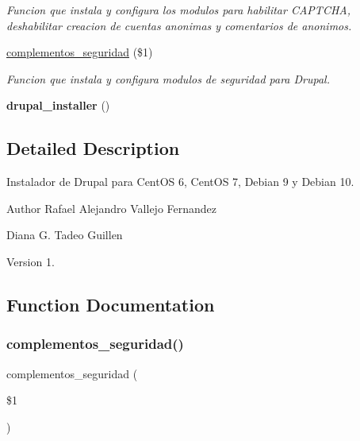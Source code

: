 \begin{DoxyCompactItemize}
\begin{DoxyCompactList}\small\item\em Funcion que instala y configura los modulos para habilitar C\+A\+P\+T\+C\+HA, deshabilitar creacion de cuentas anonimas y comentarios de anonimos. \end{DoxyCompactList}\item 
\hyperlink{Drupal__Instalador__General_8sh_a13df4a377004ee8af67f8e2495fe1afd}{complementos\+\_\+seguridad} (\$1)
\begin{DoxyCompactList}\small\item\em Funcion que instala y configura modulos de seguridad para Drupal. \end{DoxyCompactList}\item 
\mbox{\label{Drupal__Instalador__General_8sh_a829178a8034b48b89aa02399b2cef0f2}} 
{\bfseries drupal\+\_\+installer} ()
\end{DoxyCompactItemize}


\subsection{Detailed Description}
Instalador de Drupal para Cent\+OS 6, Cent\+OS 7, Debian 9 y Debian 10. 

\begin{DoxyAuthor}{Author}
Rafael Alejandro Vallejo Fernandez 

Diana G. Tadeo Guillen 
\end{DoxyAuthor}
\begin{DoxyVersion}{Version}
1. 
\end{DoxyVersion}


\subsection{Function Documentation}
\mbox{\label{Drupal__Instalador__General_8sh_a13df4a377004ee8af67f8e2495fe1afd}} 
\subsubsection{\texorpdfstring{complementos\+\_\+seguridad()}{complementos\_seguridad()}}
{\footnotesize\ttfamily complementos\+\_\+seguridad (\begin{DoxyParamCaption}\item[{}]{\$1 }\end{DoxyParamCaption})}




